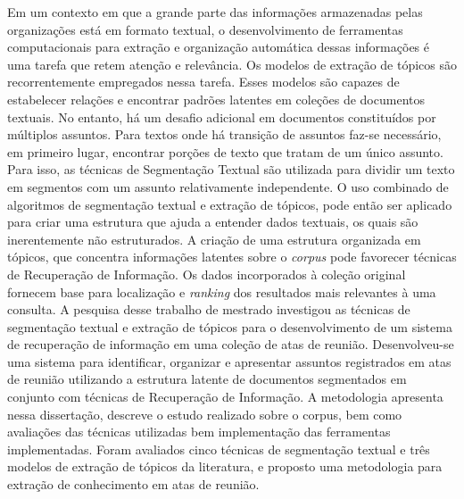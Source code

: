 






Em um contexto em que a grande parte das informações armazenadas pelas organizações está em formato textual, o desenvolvimento de ferramentas computacionais para extração e organização automática dessas informações é uma tarefa que retem atenção e relevância.
%
Os modelos de extração de tópicos são recorrentemente empregados nessa tarefa. Esses modelos são capazes de estabelecer relações e encontrar padrões latentes em coleções de documentos textuais.
%
No entanto, há um desafio adicional em documentos constituídos por múltiplos assuntos. Para textos onde há transição de assuntos faz-se necessário, em primeiro lugar, encontrar porções de texto que tratam de um único assunto. Para isso, as técnicas de Segmentação Textual são utilizada para dividir um texto em segmentos com um assunto relativamente independente.
O uso combinado de algoritmos de segmentação textual e extração de tópicos, pode então ser aplicado para criar uma estrutura que ajuda a entender dados textuais, os quais são inerentemente não estruturados.
%
A criação de uma estrutura organizada em tópicos, que concentra informações latentes sobre o \textit{corpus} pode favorecer técnicas de Recuperação de Informação. Os dados incorporados à coleção original fornecem base para localização e \textit{ranking} dos resultados mais relevantes à uma consulta. 
% 
A pesquisa desse trabalho de mestrado investigou as técnicas de segmentação textual e extração de tópicos para o desenvolvimento de um sistema de recuperação de informação em uma coleção de atas de reunião. 
% 
Desenvolveu-se uma sistema para identificar, organizar e apresentar assuntos registrados em atas de reunião utilizando a estrutura latente de documentos segmentados em conjunto com técnicas de Recuperação de Informação.
% 
A metodologia apresenta nessa dissertação, descreve o estudo realizado sobre o corpus, bem como avaliações das técnicas utilizadas bem implementação das ferramentas implementadas. 
% 
Foram avaliados cinco técnicas de segmentação textual e três modelos de extração de tópicos da literatura, e proposto uma metodologia para extração de conhecimento em atas de reunião.













